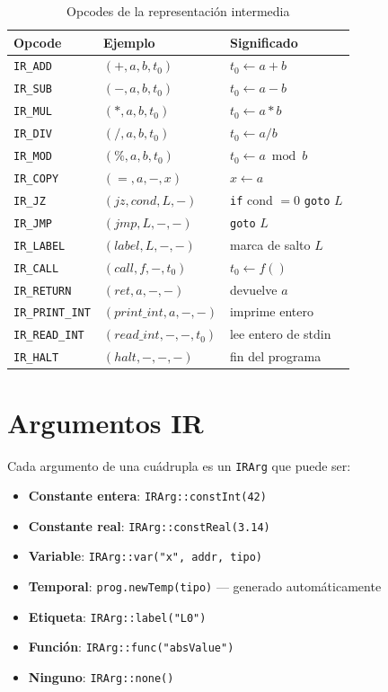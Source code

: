 \begin{table}[H]
  \centering
  \caption{Opcodes de la representación intermedia}
  \label{tab:opcodes}
  \begin{tabular}{llp{7cm}}
    \toprule
    \textbf{Opcode}   & \textbf{Ejemplo}          & \textbf{Significado} \\
    \midrule
    \texttt{IR\_ADD}  & $(+, a, b, t_0)$         & $t_0 \leftarrow a + b$ \\
    \texttt{IR\_SUB}  & $(-, a, b, t_0)$         & $t_0 \leftarrow a - b$ \\
    \texttt{IR\_MUL}  & $(*, a, b, t_0)$         & $t_0 \leftarrow a * b$ \\
    \texttt{IR\_DIV}  & $(/, a, b, t_0)$         & $t_0 \leftarrow a / b$ \\
    \texttt{IR\_MOD}  & $(\%, a, b, t_0)$        & $t_0 \leftarrow a \bmod b$ \\
    \texttt{IR\_COPY} & $(=, a, -, x)$           & $x \leftarrow a$ \\
    \texttt{IR\_JZ}   & $(jz, cond, L, -)$       & \texttt{if} cond $= 0$ \texttt{goto} $L$ \\
    \texttt{IR\_JMP}  & $(jmp, L, -, -)$         & \texttt{goto} $L$ \\
    \texttt{IR\_LABEL}& $(label, L, -, -)$       & marca de salto $L$ \\
    \texttt{IR\_CALL} & $(call, f, -, t_0)$      & $t_0 \leftarrow f()$ \\
    \texttt{IR\_RETURN}& $(ret, a, -, -)$        & devuelve $a$ \\
    \texttt{IR\_PRINT\_INT}& $(print\_int, a, -, -)$ & imprime entero \\
    \texttt{IR\_READ\_INT} & $(read\_int, -, -, t_0)$ & lee entero de stdin \\
    \texttt{IR\_HALT} & $(halt, -, -, -)$        & fin del programa \\
    \bottomrule
  \end{tabular}
\end{table}

\section{Argumentos IR}

Cada argumento de una cuádrupla es un \texttt{IRArg} que puede ser:

\begin{itemize}
  \item \textbf{Constante entera}: \texttt{IRArg::constInt(42)}
  \item \textbf{Constante real}: \texttt{IRArg::constReal(3.14)}
  \item \textbf{Variable}: \texttt{IRArg::var("x", addr, tipo)}
  \item \textbf{Temporal}: \texttt{prog.newTemp(tipo)} — generado automáticamente
  \item \textbf{Etiqueta}: \texttt{IRArg::label("L0")}
  \item \textbf{Función}: \texttt{IRArg::func("absValue")}
  \item \textbf{Ninguno}: \texttt{IRArg::none()}
\end{itemize}


